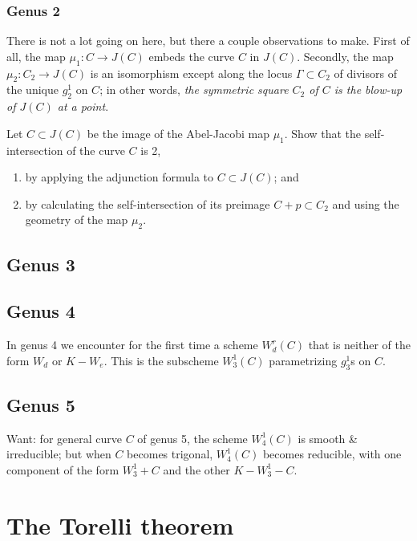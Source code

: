 \subsubsection{Genus 2} There is not a lot going on here, but there a couple observations to make. First of all, the map $\mu_1 : C \to J(C)$ embeds the curve $C$ in $J(C)$. Secondly, the map $\mu_2 : C_2 \to J(C)$ is an isomorphism except along the locus $\Gamma \subset C_2$ of divisors of the unique $g^1_2$ on $C$; in other words, \emph{the symmetric square $C_2$ of $C$ is the blow-up of $J(C)$ at a point}.

\begin{exercise}
Let $C \subset J(C)$ be the image of the Abel-Jacobi map $\mu_1$. Show that the self-intersection of the curve $C$ is 2,
\begin{enumerate}
\item by applying the adjunction formula to $C \subset J(C)$; and
\item by calculating the self-intersection of its preimage $C + p \subset C_2$ and using the geometry of the map $\mu_2$.
\end{enumerate}
\end{exercise}

\subsection{Genus 3}


\subsection{Genus 4}

In genus 4 we encounter for the first time a scheme $W^r_d(C)$ that is neither of the form $W_d$ or $K - W_e$. This is the subscheme $W^1_3(C)$ parametrizing $g^1_3$s on $C$.

\subsection{Genus 5}

Want: for general curve $C$ of genus 5, the scheme $W^1_4(C)$ is smooth \& irreducible; but when $C$ becomes trigonal, $W^1_4(C)$ becomes reducible, with one component of the form $W^1_3 + C$ and the other $K - W^1_3 - C$.



\section{The Torelli theorem}

